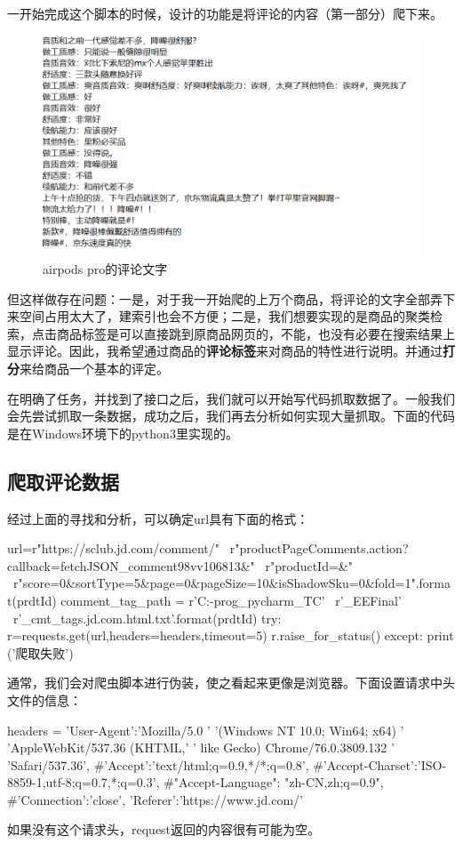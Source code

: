 一开始完成这个脚本的时候，设计的功能是将评论的内容（第一部分）爬下来。
\begin{figure}[htbp]
\centering
\includegraphics[width=13.5cm]{cmt contents eg jd.png}
\caption{airpods pro的评论文字} %
\end{figure}
但这样做存在问题：一是，对于我一开始爬的上万个商品，将评论的文字全部弄下来空间占用太大了，建索引也会不方便；二是，我们想要实现的是商品的聚类检索，点击商品标签是可以直接跳到原商品网页的，不能，也没有必要在搜索结果上显示评论。因此，我希望通过商品的\textbf{评论标签}来对商品的特性进行说明。并通过\textbf{打分}来给商品一个基本的评定。

在明确了任务，并找到了接口之后，我们就可以开始写代码抓取数据了。一般我们会先尝试抓取一条数据，成功之后，我们再去分析如何实现大量抓取。下面的代码是在Windows环境下的python3里实现的。

\subsection{爬取评论数据}
经过上面的寻找和分析，可以确定url具有下面的格式：
\begin{python}
url=r"https://sclub.jd.com/comment/" \
    r"productPageComments.action?callback=fetchJSON_comment98vv106813&" \
    r"productId={}&" \
    r"score=0&sortType=5&page=0&pageSize=10&isShadowSku=0&fold=1".format(prdtId)
comment_tag_path = r'C:\TC-prog\JetBrain_pycharm_TC' \
                   r'\PycharmProjects\Crawler_EEFinal' \
                   r'\jd_cmt_tags\httpsitem.jd.com{}.html.txt'.format(prdtId)
try:
    r=requests.get(url,headers=headers,timeout=5)
    r.raise_for_status()
except:
    print ('爬取失败')
\end{python}
通常，我们会对爬虫脚本进行伪装，使之看起来更像是浏览器。下面设置请求中头文件的信息：
\begin{python}
headers = {'User-Agent':'Mozilla/5.0 '
                        '(Windows NT 10.0; Win64; x64) '
                        'AppleWebKit/537.36 (KHTML,'
                        ' like Gecko) Chrome/76.0.3809.132 '
                        'Safari/537.36',
#'Accept':'text/html;q=0.9,*/*;q=0.8',
#'Accept-Charset':'ISO-8859-1,utf-8;q=0.7,*;q=0.3',
#"Accept-Language": "zh-CN,zh;q=0.9",
#'Connection':'close',
'Referer':'https://www.jd.com/'
}
\end{python}
如果没有这个请求头，request返回的内容很有可能为空。

